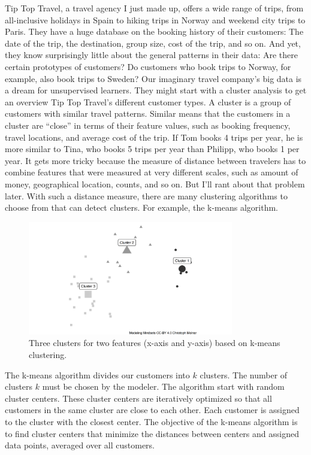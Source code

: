 \documentclass[
  10pt,
]{scrbook}
\begin{document}
Tip Top Travel, a travel agency I just made up, offers a wide range of trips, from all-inclusive holidays in Spain to hiking trips in Norway and weekend city trips to Paris.
They have a huge database on the booking history of their customers:
The date of the trip, the destination, group size, cost of the trip, and so on.
And yet, they know surprisingly little about the general patterns in their data:
Are there certain prototypes of customers?
Do customers who book trips to Norway, for example, also book trips to Sweden?
Our imaginary travel company's big data is a dream for unsupervised learners.
They might start with a cluster analysis to get an overview Tip Top Travel's different customer types.
A cluster is a group of customers with similar travel patterns.
Similar means that the customers in a cluster are ``close'' in terms of their feature values, such as booking frequency, travel locations, and average cost of the trip.
If Tom books 4 trips per year, he is more similar to Tina, who books 5 trips per year than Philipp, who books 1 per year.
It gets more tricky because the measure of distance between travelers has to combine features that were measured at very different scales, such as amount of money, geographical location, counts, and so on.
But I'll rant about that problem later.
With such a distance measure, there are many clustering algorithms to choose from that can detect clusters.
For example, the k-means algorithm.

\begin{figure}

{\centering \includegraphics[width=0.8\textwidth]{figures/clustering1-1} 

}

\caption{Three clusters for two features (x-axis and y-axis) based on k-means clustering.}\label{fig:clustering1}
\end{figure}

The k-means algorithm divides our customers into \(k\) clusters.
The number of clusters \(k\) must be chosen by the modeler.
The algorithm start with random cluster centers.
These cluster centers are iteratively optimized so that all customers in the same cluster are close to each other.
Each customer is assigned to the cluster with the closest center.
The objective of the k-means algorithm is to find cluster centers that minimize the distances between centers and assigned data points, averaged over all customers.
\end{document}
